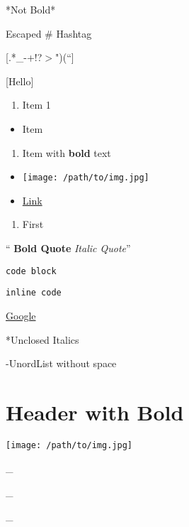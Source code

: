 \documentclass{article}
\begin{document}

*Not Bold*

Escaped \# Hashtag

[.*\_-+!?$>$")(``]

[Hello]



\begin{enumerate}
    \item Item 1
\end{enumerate}

\begin{itemize}
    \item Item
\end{itemize}

\begin{enumerate}
    \item Item with \textbf{bold} text
\end{enumerate}

\begin{itemize}
    \item \texttt{[image: /path/to/img.jpg]}
    \item \href{http://example.com}{Link}
\end{itemize}



\begin{enumerate}
    \item First
\end{enumerate}



\enquote{    \textbf{Bold Quote}
    \textit{Italic Quote}}



\begin{verbatim}
code block
\end{verbatim}

\texttt{inline code}



\href{https://www.google.com}{Google}



*Unclosed Italics

-UnordList without space



\section{Header with \textbf{Bold}}




\texttt{[image: /path/to/img.jpg]}



\_\hrulefill

\_\hrulefill

\_\hrulefill
\end{document}
